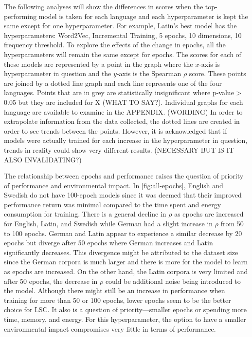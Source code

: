 The following analyses will show the differences in scores when the top-performing model is taken for each language and each hyperparameter is kept the same except for one hyperparameter. For example, Latin’s best model has the hyperparameters: Word2Vec, Incremental Training, 5 epochs, 10 dimensions, 10 frequency threshold. To explore the effects of the change in epochs, all the hyperparameters will remain the same except for epochs. The scores for each of these models are represented by a point in the graph where the $x$-axis is hyperparameter in question and the $y$-axis is  the Spearman $\rho$ score. These points are joined by a dotted line graph and each line represents one of the four languages. Points that are in grey are statistically insignificant where p-value > 0.05 but they are included for X (WHAT TO SAY?). Individual graphs for each language are available to examine in the APPENDIX. (WORDING) In order to extrapolate information from the data collected, the dotted lines are created in order to see trends between the points. However, it is acknowledged that if models were actually trained for each increase in the hyperparameter in question, trends in reality could show very different results. (NECESSARY BUT IS IT ALSO INVALIDATING?)

The relationship between epochs and performance raises the question of priority of performance and environmental impact. In \autoref{fig:all-epochs}, English and Swedish do not have 100-epoch models since it was deemed that their improved performance return was minimal compared to the time spent and energy consumption for training. There is a general decline in $\rho$ as epochs are increased for English, Latin, and Swedish while German had a slight increase in $\rho$ from 50 to 100 epochs. German and Latin appear to experience a similar decrease by 20 epochs but diverge after 50 epochs where German increases and Latin significantly decreases. This divergence might be attributed to the dataset size since the German corpora is much larger and there is more for the model to learn as epochs are increased. On the other hand, the Latin corpora is very limited and after 50 epochs, the decrease in $\rho$ could be additional noise being introduced to the model. Although there might still be an increase in performance when training for more than 50 or 100 epochs, lower epochs seem to be the better choice for LSC. It also is a question of priority—smaller epochs or spending more time, memory, and energy. For this hyperparameter, the option to have a smaller environmental impact compromises very little in terms of performance. 

